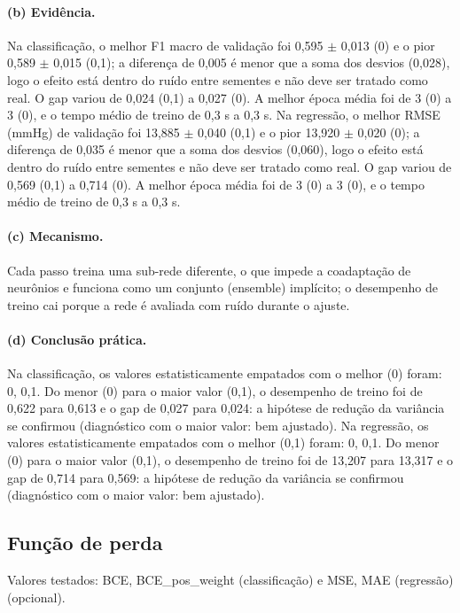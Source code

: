 \documentclass[11pt,a4paper]{article}
\begin{document}
\paragraph{(b) Evidência.} Na classificação, o melhor F1 macro de validação foi 0,595 $\pm$ 0,013 (0) e o pior 0,589 $\pm$ 0,015 (0,1); a diferença de 0,005 é menor que a soma dos desvios (0,028), logo o efeito está dentro do ruído entre sementes e não deve ser tratado como real. O gap variou de 0,024 (0,1) a 0,027 (0). A melhor época média foi de 3 (0) a 3 (0), e o tempo médio de treino de 0,3 s a 0,3 s. Na regressão, o melhor RMSE (mmHg) de validação foi 13,885 $\pm$ 0,040 (0,1) e o pior 13,920 $\pm$ 0,020 (0); a diferença de 0,035 é menor que a soma dos desvios (0,060), logo o efeito está dentro do ruído entre sementes e não deve ser tratado como real. O gap variou de 0,569 (0,1) a 0,714 (0). A melhor época média foi de 3 (0) a 3 (0), e o tempo médio de treino de 0,3 s a 0,3 s.

\paragraph{(c) Mecanismo.} Cada passo treina uma sub-rede diferente, o que impede a coadaptação de neurônios e funciona como um conjunto (ensemble) implícito; o desempenho de treino cai porque a rede é avaliada com ruído durante o ajuste.

\paragraph{(d) Conclusão prática.} Na classificação, os valores estatisticamente empatados com o melhor (0) foram: 0, 0,1. Do menor (0) para o maior valor (0,1), o desempenho de treino foi de 0,622 para 0,613 e o gap de 0,027 para 0,024: a hipótese de redução da variância se confirmou (diagnóstico com o maior valor: bem ajustado). Na regressão, os valores estatisticamente empatados com o melhor (0,1) foram: 0, 0,1. Do menor (0) para o maior valor (0,1), o desempenho de treino foi de 13,207 para 13,317 e o gap de 0,714 para 0,569: a hipótese de redução da variância se confirmou (diagnóstico com o maior valor: bem ajustado).

\subsection{Função de perda}
Valores testados: BCE, BCE\_pos\_weight (classificação) e MSE, MAE (regressão) (opcional).
\end{document}
